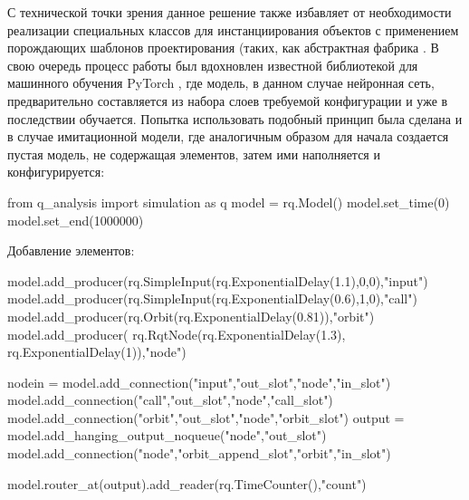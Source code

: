 С технической точки зрения данное решение также избавляет от необходимости реализации специальных классов для инстанциирования объектов с применением порождающих шаблонов проектирования (таких, как абстрактная фабрика \cite{fowler1997analysis}. В свою очередь процесс работы был вдохновлен известной библиотекой для машинного обучения PyTorch \cite{pytorch}, где модель, в данном случае нейронная сеть, предварительно составляется из набора слоев требуемой конфигурации и уже в последствии обучается. Попытка использовать подобный принцип была сделана и в случае имитационной модели, где аналогичным образом для начала создается пустая модель, не содержащая элементов, затем ими наполняется и конфигурируется: 
\begin{pyin} [pyexampleinit]
from q_analysis import simulation as q
model = rq.Model()
model.set_time(0) 
model.set_end(1000000)
\end{pyin}
Добавление элементов:
\begin{pyin}[pyexampleaddproducers]
model.add_producer(rq.SimpleInput(rq.ExponentialDelay(1.1),0,0),"input")
model.add_producer(rq.SimpleInput(rq.ExponentialDelay(0.6),1,0),"call")
model.add_producer(rq.Orbit(rq.ExponentialDelay(0.81)),"orbit")
model.add_producer(
             rq.RqtNode(rq.ExponentialDelay(1.3),
             rq.ExponentialDelay(1)),"node")
\end{pyin}

\begin{pyin}[pyexampleaddconnections]
nodein = model.add_connection("input","out_slot","node","in_slot")
model.add_connection("call","out_slot","node","call_slot")
model.add_connection("orbit","out_slot","node","orbit_slot")
output = model.add_hanging_output_noqueue("node","out_slot")
model.add_connection("node","orbit_append_slot","orbit","in_slot")
\end{pyin}

\begin{pyin}[pyexampleaddreaders]
model.router_at(output).add_reader(rq.TimeCounter(),"count")
\end{pyin}

